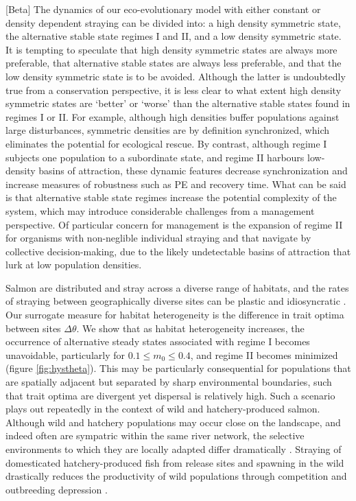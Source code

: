 \documentclass{revtex4}
\begin{document}
[Beta] The dynamics of our eco-evolutionary model with either constant or density dependent straying can be divided into: a high density symmetric state, the alternative stable state regimes I and II, and a low density symmetric state.
It is tempting to speculate that high density symmetric states are always more preferable, that alternative stable states are always less preferable, and that the low density symmetric state is to be avoided.
Although the latter is undoubtedly true from a conservation perspective, it is less clear to what extent high density symmetric states are `better' or `worse' than the alternative stable states found in regimes I or II.
For example, although high densities buffer populations against large disturbances, symmetric densities are by definition synchronized, which eliminates the potential for ecological rescue.
By contrast, although regime I subjects one population to a subordinate state, and regime II harbours low-density basins of attraction, these dynamic features decrease synchronization and increase measures of robustness such as PE and recovery time.
What can be said is that alternative stable state regimes increase the potential complexity of the system, which may introduce considerable challenges from a management perspective.
Of particular concern for management is the expansion of regime II for organisms with non-neglible individual straying and that navigate by collective decision-making, due to the likely undetectable basins of attraction that lurk at low population densities.


Salmon are distributed and stray across a diverse range of habitats, and the rates of straying between geographically diverse sites can be plastic and idiosyncratic \citep{Westley:2015to}.
Our surrogate measure for habitat heterogeneity is the difference in trait optima between sites $\Delta\theta$.
We show that as habitat heterogeneity increases, the occurrence of alternative steady states associated with regime I becomes unavoidable, particularly for $0.1 \leq m_0 \leq 0.4$, and regime II becomes minimized (figure \ref{fig:hystheta}).
This may be particularly consequential for populations that are spatially adjacent but separated by sharp environmental boundaries, such that trait optima are divergent yet dispersal is relatively high.
Such a scenario plays out repeatedly in the context of wild and hatchery-produced salmon. 
Although wild and hatchery populations may occur close on the landscape, and indeed often are sympatric within the same river network, the selective environments to which they are locally adapted differ dramatically \citep{Christie:2012bj}. 
Straying of domesticated hatchery-produced fish from release sites and spawning in the wild drastically reduces the productivity of wild populations through competition and outbreeding depression \citep{Chilcote:2003bb,Araki:2007cm}.
\end{document}
